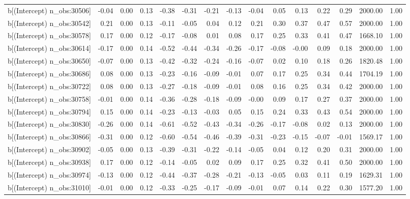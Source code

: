 \begin{table}[ht]
\begin{tabular}{rrrrrrrrrrrrrrr}
  b[(Intercept) n\_obs:30506] & -0.04 & 0.00 & 0.13 & -0.38 & -0.31 & -0.21 & -0.13 & -0.04 & 0.05 & 0.13 & 0.22 & 0.29 & 2000.00 & 1.00 \\ 
  b[(Intercept) n\_obs:30542] & 0.21 & 0.00 & 0.13 & -0.11 & -0.05 & 0.04 & 0.12 & 0.21 & 0.30 & 0.37 & 0.47 & 0.57 & 2000.00 & 1.00 \\ 
  b[(Intercept) n\_obs:30578] & 0.17 & 0.00 & 0.12 & -0.17 & -0.08 & 0.01 & 0.08 & 0.17 & 0.25 & 0.33 & 0.41 & 0.47 & 1668.10 & 1.00 \\ 
  b[(Intercept) n\_obs:30614] & -0.17 & 0.00 & 0.14 & -0.52 & -0.44 & -0.34 & -0.26 & -0.17 & -0.08 & -0.00 & 0.09 & 0.18 & 2000.00 & 1.00 \\ 
  b[(Intercept) n\_obs:30650] & -0.07 & 0.00 & 0.13 & -0.42 & -0.32 & -0.24 & -0.16 & -0.07 & 0.02 & 0.10 & 0.18 & 0.26 & 1820.48 & 1.00 \\ 
  b[(Intercept) n\_obs:30686] & 0.08 & 0.00 & 0.13 & -0.23 & -0.16 & -0.09 & -0.01 & 0.07 & 0.17 & 0.25 & 0.34 & 0.44 & 1704.19 & 1.00 \\ 
  b[(Intercept) n\_obs:30722] & 0.08 & 0.00 & 0.13 & -0.27 & -0.18 & -0.09 & -0.01 & 0.08 & 0.16 & 0.25 & 0.34 & 0.42 & 2000.00 & 1.00 \\ 
  b[(Intercept) n\_obs:30758] & -0.01 & 0.00 & 0.14 & -0.36 & -0.28 & -0.18 & -0.09 & -0.00 & 0.09 & 0.17 & 0.27 & 0.37 & 2000.00 & 1.00 \\ 
  b[(Intercept) n\_obs:30794] & 0.15 & 0.00 & 0.14 & -0.23 & -0.13 & -0.03 & 0.05 & 0.15 & 0.24 & 0.33 & 0.43 & 0.54 & 2000.00 & 1.00 \\ 
  b[(Intercept) n\_obs:30830] & -0.26 & 0.00 & 0.14 & -0.61 & -0.52 & -0.43 & -0.34 & -0.26 & -0.17 & -0.08 & 0.02 & 0.13 & 2000.00 & 1.00 \\ 
  b[(Intercept) n\_obs:30866] & -0.31 & 0.00 & 0.12 & -0.60 & -0.54 & -0.46 & -0.39 & -0.31 & -0.23 & -0.15 & -0.07 & -0.01 & 1569.17 & 1.00 \\ 
  b[(Intercept) n\_obs:30902] & -0.05 & 0.00 & 0.13 & -0.39 & -0.31 & -0.22 & -0.14 & -0.05 & 0.04 & 0.12 & 0.20 & 0.31 & 2000.00 & 1.00 \\ 
  b[(Intercept) n\_obs:30938] & 0.17 & 0.00 & 0.12 & -0.14 & -0.05 & 0.02 & 0.09 & 0.17 & 0.25 & 0.32 & 0.41 & 0.50 & 2000.00 & 1.00 \\ 
  b[(Intercept) n\_obs:30974] & -0.13 & 0.00 & 0.12 & -0.44 & -0.37 & -0.28 & -0.21 & -0.13 & -0.05 & 0.03 & 0.11 & 0.19 & 1629.31 & 1.00 \\ 
  b[(Intercept) n\_obs:31010] & -0.01 & 0.00 & 0.12 & -0.33 & -0.25 & -0.17 & -0.09 & -0.01 & 0.07 & 0.14 & 0.22 & 0.30 & 1577.20 & 1.00 \\ 

\end{tabular}
\end{table}
